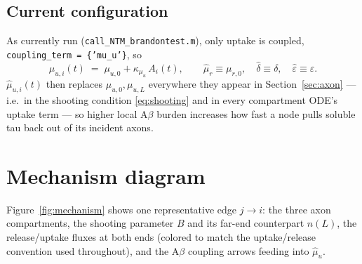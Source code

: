 ﻿\documentclass[11pt]{article}
\newcommand{\mur}{\mu_{r}}
\newcommand{\muu}{\mu_{u}}
\begin{document}
\subsection{Current configuration}

As currently run (\texttt{call\_NTM\_brandontest.m}), only uptake is coupled,
\texttt{coupling\_term = \{'mu\_u'\}}, so
\[
  \hat\mu_{u,i}(t) \;=\; \mu_{u,0} + \kappa_{\muu}\,A_i(t), \qquad
  \hat\mur \equiv \mu_{r,0}, \quad \hat\delta\equiv\delta, \quad \hat\varepsilon\equiv\varepsilon .
\]
$\hat\mu_{u,i}(t)$ then replaces $\mu_{u,0},\mu_{u,L}$ everywhere they appear in
Section~\ref{sec:axon} --- i.e.\ in the shooting condition \eqref{eq:shooting}
and in every compartment ODE's uptake term --- so higher local A$\beta$ burden
increases how fast a node pulls soluble tau back out of its incident axons.

\section{Mechanism diagram}

Figure~\ref{fig:mechanism} shows one representative edge $j\to i$: the three
axon compartments, the shooting parameter $B$ and its far-end counterpart
$n(L)$, the release/uptake fluxes at both ends (colored to match the
uptake/release convention used throughout), and the A$\beta$ coupling arrows
feeding into $\hat\muu$.
\end{document}
